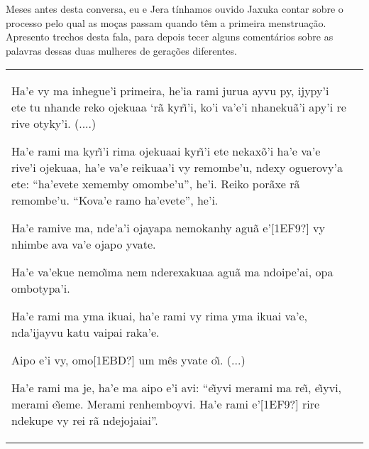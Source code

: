 \documentclass{article}
\begin{document}
Meses antes desta conversa, eu e Jera t\'inhamos ouvido Jaxuka contar
sobre o processo pelo qual as mo\c{c}as passam quando t\^em a primeira
menstrua\c{c}\~ao. Apresento trechos desta fala, para depois tecer
alguns coment\'arios sobre as palavras dessas duas mulheres de
gera\c{c}\~oes diferentes. 

\begin{flushleft}
\tablehead{}
\begin{supertabular}{m{2.87756in}|m{2.8781598in}}
Ha{\textquoteright}e vy ma inhegue{\textquoteright}i primeira,
he{\textquoteright}ia rami jurua ayvu py, ijypy{\textquoteright}i ete
tu nhande reko ojekuaa {\textquoteleft}r\~a kyr\~\i{\textquoteright}i,
ko{\textquoteright}i va{\textquoteright}e{\textquoteright}i
nhaneku\~a{\textquoteright}i apy{\textquoteright}i re rive
otyky{\textquoteright}i. (....)

Ha{\textquoteright}e rami ma kyr\~\i{\textquoteright}i rima ojekuaai
kyr\~\i{\textquoteright}i ete nekax\~o{\textquoteright}i
ha{\textquoteright}e va{\textquoteright}e rive{\textquoteright}i
ojekuaa, ha{\textquoteright}e va{\textquoteright}e
reikuaa{\textquoteright}i vy remombe{\textquoteright}u, ndexy
oguerovy{\textquoteright}a ete:
{\textquotedblleft}ha{\textquoteright}evete xememby
omombe{\textquoteright}u{\textquotedblright}, he{\textquoteright}i.
Reiko por\~axe r\~a remombe{\textquoteright}u.
{\textquotedblleft}Kova{\textquoteright}e ramo
ha{\textquoteright}evete{\textquotedblright}, he{\textquoteright}i.

Ha{\textquoteright}e ramive ma, nde{\textquoteright}a{\textquoteright}i
ojayapa nemokanhy agu\~a e{\textquoteright}[1EF9?] vy nhimbe ava
va{\textquoteright}e ojapo yvate. 

Ha{\textquoteright}e va{\textquoteright}ekue nemo\~\i ma nem nderexakuaa
agu\~a ma ndoipe{\textquoteright}ai, opa ombotypa{\textquoteright}i. 

Ha{\textquoteright}e rami ma yma ikuai, ha{\textquoteright}e rami vy
rima yma ikuai va{\textquoteright}e, nda{\textquoteright}ijayvu katu
vaipai raka{\textquoteright}e.

Aipo e{\textquoteright}i vy, omo[1EBD?] um m\^es yvate o\~\i. (...)

Ha{\textquoteright}e rami ma je, ha{\textquoteright}e ma aipo
e{\textquoteright}i avi: {\textquotedblleft}e\~\i yvi merami ma re\~\i,
e\~\i yvi, merami e\~\i eme. Merami renhemboyvi. Ha{\textquoteright}e
rami e{\textquoteright}[1EF9?] rire ndekupe vy rei r\~a
ndejojaiai{\textquotedblright}. 


\end{supertabular}
\end{flushleft}
\end{document}
